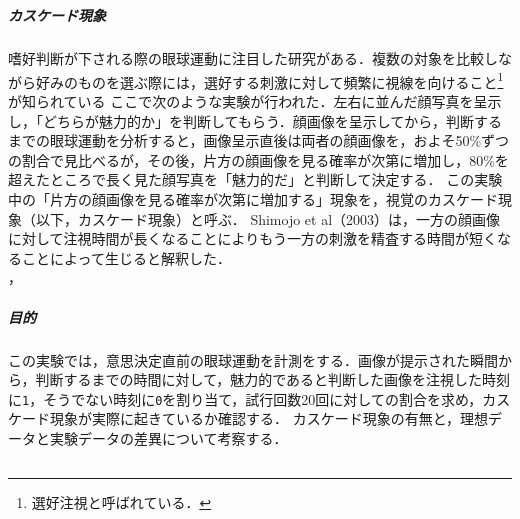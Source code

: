\chapter{\kadaia}
\section{\purpose}
\paragraph{カスケード現象}
嗜好判断が下される際の眼球運動に注目した研究がある．複数の対象を比較しながら好みのものを選ぶ際には，選好する刺激に対して頻繁に視線を向けること\footnote{選好注視と呼ばれている．}が知られている
ここで次のような実験が行われた．左右に並んだ顔写真を呈示し，「どちらが魅力的か」を判断してもらう．顔画像を呈示してから，判断するまでの眼球運動を分析すると，画像呈示直後は両者の顔画像を，およそ50\%ずつの割合で見比べるが，その後，片方の顔画像を見る確率が次第に増加し，80\%を超えたところで長く見た顔写真を「魅力的だ」と判断して決定する．
この実験中の「片方の顔画像を見る確率が次第に増加する」現象を，視覚のカスケード現象（以下，カスケード現象）と呼ぶ．
Shimojo et al（2003）は，一方の顔画像に対して注視時間が長くなることによりもう一方の刺激を精査する時間が短くなることによって生じると解釈した．\\
\hfill\cite[p.202]{美感}，\cite{潜在呈示した情報が選択判断時の視線の動きに与える影響}\par
\paragraph{目的}この実験では，意思決定直前の眼球運動を計測をする．画像が提示された瞬間から，判断するまでの時間に対して，魅力的であると判断した画像を注視した時刻に\texttt{1}，そうでない時刻に\texttt{0}を割り当て，試行回数20回に対しての割合を求め，カスケード現象が実際に起きているか確認する．
カスケード現象の有無と，理想データと実験データの差異について考察する．
\section{\method}
\newcommand{\elt}{\texttt{Eye Link Ⅱ}}
\newcommand{\csv}{\texttt{CSV}}
